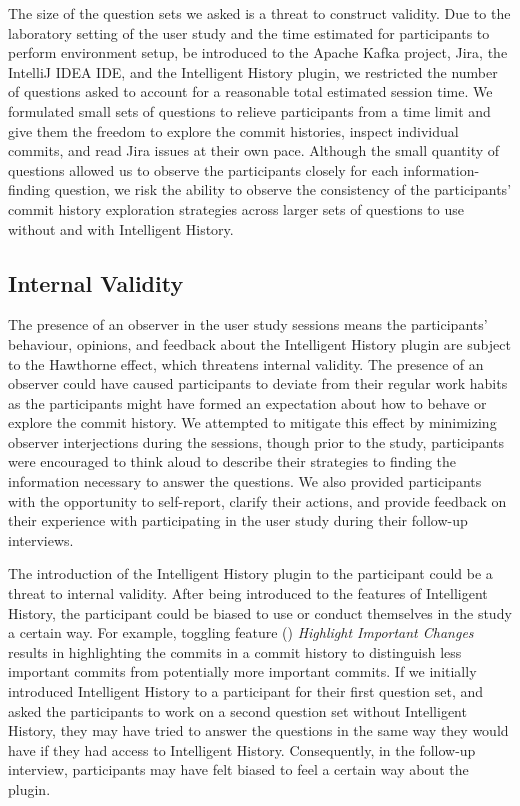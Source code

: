 The size of the question sets we asked is a threat to construct validity.
Due to the laboratory setting of the user study and the time estimated for participants to perform environment setup,
be introduced to the Apache Kafka project, Jira, the IntelliJ IDEA IDE, and the Intelligent History plugin,
we restricted the number of questions asked to account for a reasonable total estimated session time.
We formulated small sets of questions to relieve participants from a time limit 
and give them the freedom to explore the commit histories, inspect individual commits, and read Jira issues at their own pace.
Although the small quantity of questions allowed us to observe the participants closely for each information-finding question,
we risk the ability to observe the consistency of the participants' commit history exploration strategies
 across larger sets of questions to use without and with Intelligent History.

\subsection{Internal Validity}

The presence of an observer in the user study sessions means the participants' behaviour, opinions, 
and feedback about the Intelligent History plugin are subject to the Hawthorne effect,
which threatens internal validity.
The presence of an observer could have caused participants to deviate from their regular work habits 
as the participants might have formed an expectation about how to behave or explore the commit history.
We attempted to mitigate this effect by minimizing observer interjections during the sessions, 
though prior to the study, participants were encouraged to think aloud to describe their strategies 
to finding the information necessary to answer the questions.
We also provided participants with the opportunity to self-report, clarify their actions, 
and provide feedback on their experience with participating in the user study during their follow-up interviews.

The introduction of the Intelligent History plugin to the participant could be a threat to internal validity.
After being introduced to the features of Intelligent History, 
the participant could be biased to use or conduct themselves in the study a certain way.
For example, toggling feature () \textit{Highlight Important Changes} 
results in highlighting the commits in a commit history to distinguish less important commits from potentially more important commits.
If we initially introduced Intelligent History to a participant for their first question set,
and asked the participants to work on a second question set without Intelligent History,
they may have tried to answer the questions in the same way they would have if they had access to Intelligent History.
Consequently, in the follow-up interview, participants may have felt biased to feel a certain way about the plugin.


